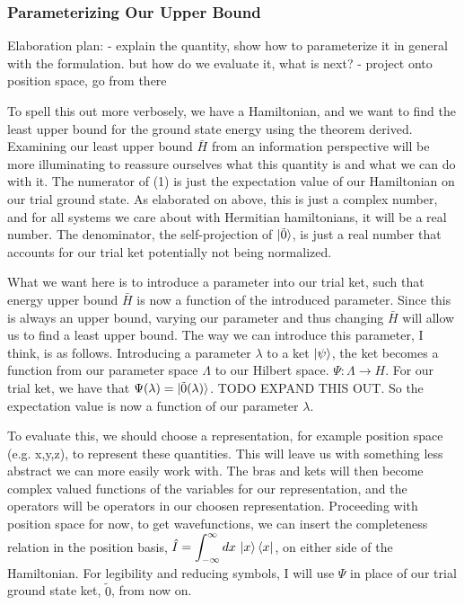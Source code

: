 \documentclass[12pt]{article}
\begin{document}
\subsubsection{Parameterizing Our Upper Bound}
Elaboration plan:
- explain the quantity, show how to parameterize it in general with the formulation. but how do we evaluate it, what is next?
- project onto position space, go from there

\hspace{1cm} To spell this out more verbosely, we have a Hamiltonian, and we want to find the least upper bound for the ground state energy using the theorem derived. Examining our least upper bound $\bar{H}$ from an information perspective will be more illuminating to reassure ourselves what this quantity is and what we can do with it. The numerator of (1) is just the expectation value of our Hamiltonian on our trial ground state. As elaborated on above, this is just a complex number, and for all systems we care about with Hermitian hamiltonians, it will be a real number. The denominator, the self-projection of $\ket{\tilde{0}}$, is just a real number that accounts for our trial ket potentially not being normalized.

\hspace{1cm} What we want here is to introduce a parameter into our trial ket, such that energy upper bound $\bar{H}$ is now a function of the introduced parameter. Since this is always an upper bound, varying our parameter and thus changing $\bar{H}$ will allow us to find a least upper bound. The way we can introduce this parameter, I think, is as follows. Introducing a parameter $\lambda$ to a ket $\ket{\psi}$, the ket becomes a function from our parameter space $\Lambda$ to our Hilbert space. $\Psi : \Lambda \rightarrow H$. For our trial ket, we have that $\Psi(\lambda) = \ket{\tilde{0}(\lambda)}$. TODO EXPAND THIS OUT. So the expectation value is now a function of our parameter $\lambda$. 

\hspace{1cm} To evaluate this, we should choose a representation, for example position space (e.g. x,y,z), to represent these quantities. This will leave us with something less abstract we can more easily work with. The bras and kets will then become complex valued functions of the variables for our representation, and the operators will be operators in our choosen representation. Proceeding with position space for now, to get wavefunctions, we can insert the completeness relation in the position basis, $\displaystyle \hat{I} = \int_{-\infty}^{\infty}dx \, \ket{x}\bra{x}$, on either side of the Hamiltonian. For legibility and reducing symbols, I will use $\Psi$ in place of our trial ground state ket, $\tilde{0}$, from now on.
\end{document}
